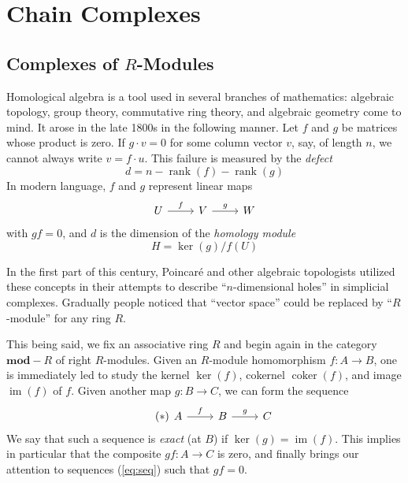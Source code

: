 \section{Chain Complexes}

\subsection{Complexes of $R$-Modules}

Homological algebra is a tool used in several branches of mathematics: algebraic topology, group theory, commutative ring theory, and algebraic geometry come to mind. It arose in the late 1800s in the following manner. Let $f$ and $g$ be matrices whose product is zero. If $g \cdot v = 0$ for some column vector $v$, say, of length $n$, we cannot always write $v = f \cdot u$. This failure is measured by the \emph{defect}
\[
  d = n - \operatorname{rank}(f) - \operatorname{rank}(g)
\]
In modern language, $f$ and $g$ represent linear maps
\begin{equation*}
  \begin{tikzcd}
    U \ar[r, "f"] & V \ar[r, "g"] & W
  \end{tikzcd}
\end{equation*}
with $gf = 0$, and $d$ is the dimension of the \emph{homology module}
\[
  H = \ker(g) / f(U)
\]

In the first part of this century, Poincaré and other algebraic topologists utilized these concepts in their attempts to describe \enquote{$n$-dimensional holes} in simplicial complexes. Gradually people noticed that \enquote{vector space} could be replaced by \enquote{$R$-module} for any ring $R$.

This being said, we fix an associative ring $R$ and begin again in the category $\mathbf{mod}\!\!-\!\!R$ of right $R$-modules. Given an $R$-module homomorphism $f : A \to B$, one is immediately led to study the kernel $\ker(f)$, cokernel $\operatorname{coker}(f)$, and image $\operatorname{im}(f)$ of $f$. Given another map $g : B \to C$, we can form the sequence
\begin{equation}
  \tag{$\ast$}
  \label{eq:seq}
  \begin{tikzcd}
    A \ar[r, "f"] & B \ar[r, "g"] & C
  \end{tikzcd}
\end{equation}
We say that such a sequence is \emph{exact} (at $B$) if $\ker(g) = \operatorname{im}(f)$. This implies in particular that the composite $gf : A \to C$ is zero, and finally brings our attention to sequences (\ref{eq:seq}) such that $gf = 0$.

